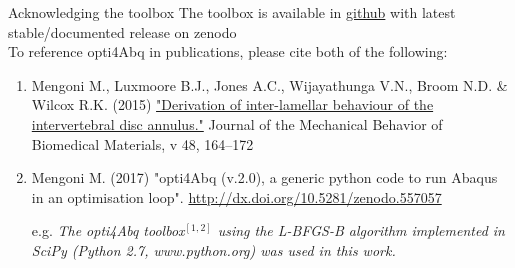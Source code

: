 \begin{frame}{Acknowledging the toolbox}
\vfill
The toolbox is available in \href{https://github.com/mengomarlene/opti4Abq}{github} with latest stable/documented release on zenodo\\[.5cm]
    
To reference opti4Abq in publications, please cite both of the following:
{\footnotesize
\begin{enumerate}
\item Mengoni M., Luxmoore B.J., Jones A.C., Wijayathunga V.N., Broom N.D. \& Wilcox R.K. (2015)
\href{http://dx.doi.org/10.1016/j.jmbbm.2015.03.028}{"Derivation of inter-lamellar behaviour of the intervertebral disc annulus."} Journal of the Mechanical Behavior of Biomedical Materials, v 48, 164–172

\item Mengoni M. (2017) "opti4Abq (v.2.0), a generic python code to run Abaqus in an optimisation loop". \url{http://dx.doi.org/10.5281/zenodo.557057}

\item[\color{black} e.g.]  {\it The opti4Abq toolbox$^{[1,2]}$ using the L-BFGS-B algorithm implemented in SciPy (Python 2.7, www.python.org) was used in this work.}
\end{enumerate}
}

\end{frame}